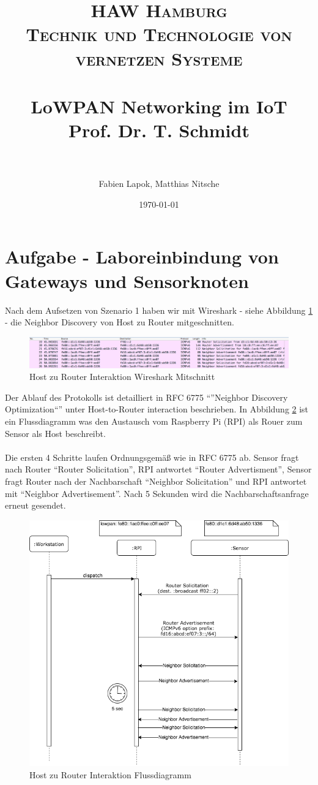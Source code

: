 \documentclass[paper=a4, fontsize=11pt]{scrartcl} %
\title {
  \normalfont \normalsize
  \textsc{HAW Hamburg} \\ [25pt] %
  \textsc{Technik und Technologie von vernetzen Systeme} \\ [15pt]
  \horrule{0.5pt} \\[0.4cm] %
  \huge LoWPAN Networking im IoT \\ [15pt] %
  \small  Prof. Dr. T. Schmidt \\
  \horrule{2pt} \\[0.5cm] %
}
\author{Fabien Lapok, Matthias Nitsche}
\date{\normalsize\today}
\numberwithin{equation}{section} %
\numberwithin{figure}{section} %
\numberwithin{table}{section} %
\begin{document}
\maketitle

\section{Aufgabe - Laboreinbindung von Gateways und Sensorknoten}

Nach dem Aufsetzen von Szenario 1 haben wir mit Wireshark - siehe Abbildung \ref{fig:hrwireshark} - die Neighbor Discovery von Host zu Router mitgeschnitten.

\begin{figure}[H]
  \centering
  \includegraphics[width=\linewidth]{imgs/host-to-router-interaction-wireshark.png}
  \caption{Host zu Router Interaktion Wireshark Mitschnitt}
  \label{fig:hrwireshark}
\end{figure}

Der Ablauf des Protokolls ist detailliert in RFC 6775 ``''Neighbor Discovery Optimization``'' unter Host-to-Router interaction beschrieben. In Abbildung \ref{fig:hrfluss} ist ein Flussdiagramm was den Austausch vom Raspberry Pi (RPI) als Rouer zum Sensor als Host beschreibt.
\\
\\
Die ersten 4 Schritte laufen Ordnungsgemäß wie in RFC 6775 ab. Sensor fragt nach Router ``Router Solicitation'', RPI antwortet ``Router Advertisment'', Sensor fragt Router nach der Nachbarschaft ``Neighbor Solicitation'' und RPI antwortet mit ``Neighbor Advertisement''. Nach 5 Sekunden wird die Nachbarschaftsanfrage erneut gesendet.

\begin{figure}[H]
  \centering
  \includegraphics[width=0.7\linewidth,height=0.7\columnwidth]{imgs/host-to-router-interaction.png}
  \caption{Host zu Router Interaktion Flussdiagramm}
  \label{fig:hrfluss}
\end{figure}
\end{document}

